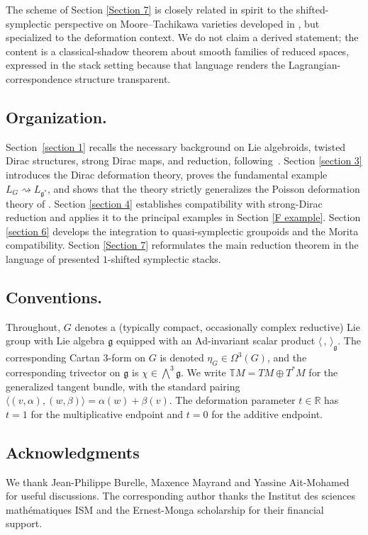 \documentclass[reqno]{amsart}
\theoremstyle{plain}
\theoremstyle{definition}
\begin{document}
The scheme of Section \ref{Section 7} is closely related in spirit to the shifted-symplectic perspective on Moore--Tachikawa varieties developed in \cite{crooks2024moore}, but specialized to the deformation context. We do not claim a derived statement; the content is a classical-shadow theorem about smooth families of
reduced spaces, expressed in the stack setting because that language renders the Lagrangian-correspondence structure transparent.
 
\subsection*{Organization.}
Section~\ref{section 1} recalls the necessary background on Lie algebroids, twisted
Dirac structures, strong Dirac maps, and reduction, following~\cite{bursztyn2005dirac,bursztyn2007dirac, bualibanu2026reduction}.
Section \ref{section 3} introduces the Dirac deformation theory, proves the
fundamental example $L_G\rightsquigarrow L_{\mathfrak{g}^*}$, and shows that the theory
strictly generalizes the Poisson deformation theory of \cite{maiza2026multiplicative}.
Section \ref{section 4} establishes compatibility with strong-Dirac reduction and applies it
to the principal examples in Section \ref{F example}.
Section \ref{section 6} develops the integration to quasi-symplectic groupoids and the
Morita compatibility. Section \ref{Section 7} reformulates the main reduction theorem in the language of presented $1$-shifted symplectic stacks.
 
\subsection*{Conventions.}
Throughout, $G$ denotes a (typically compact, occasionally complex reductive) Lie group with Lie
algebra $\mathfrak{g}$ equipped with an Ad-invariant scalar product $\langle\,,\,\rangle_{\mathfrak{g}}$.
The corresponding Cartan $3$-form on $G$ is denoted $\eta_G\in\Omega^3(G)$, and the corresponding
trivector on $\mathfrak{g}$ is $\chi\in\bigwedge^3\mathfrak{g}$. We write $\mathbb{T}M=TM\oplus T^*M$
for the generalized tangent bundle, with the standard pairing $\langle(v,\alpha),(w,\beta)\rangle=\alpha(w)+\beta(v)$.
The deformation parameter $t\in\mathbb{R}$ has $t=1$ for the multiplicative
endpoint and $t=0$ for the additive endpoint.


\subsection*{Acknowledgments} We thank Jean-Philippe Burelle, Maxence Mayrand and Yassine Ait-Mohamed for useful discussions. The corresponding author thanks the Institut des sciences mathématiques ISM and the Ernest-Monga scholarship for their financial support.
\end{document}
